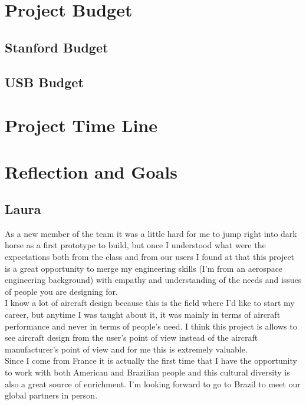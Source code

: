 \section{Project Budget}
\subsection{Stanford Budget}
\subsection{USB Budget}
 

\section{Project Time Line}
\section{Reflection and Goals}

\subsection{Laura}
As a new member of the team it was a little hard for me to jump right into dark horse as a first prototype to build, but once I understood what were the expectations both from the class and from our users I found at that this project is a great opportunity to merge my engineering skills (I’m from an aerospace engineering background) with empathy and understanding of the needs and issues of people you are designing for. \\

I know a lot of aircraft design because this is the field where I’d like to start my career, but anytime I was taught about it, it was mainly in terms of aircraft performance and never in terms of people’s need. I think this project is allows to see aircraft design from the user’s point of view instead of the aircraft manufacturer’s point of view and for me this is extremely valuable. \\

Since I come from France it is actually the first time that I have the opportunity to work with both American and Brazilian people and this cultural diversity is also a great source of enrichment. I’m looking forward to go to Brazil to meet our global partners in person. \\

